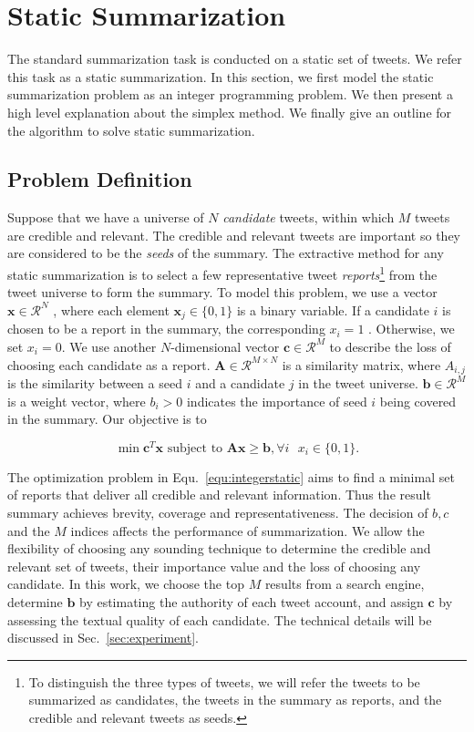 \documentclass[envcountsame]{llncs}
\begin{document}
\section{Static Summarization}\label{sec:static}
%
The standard summarization task is conducted on a static set of tweets. We refer this task as a static summarization. In this section, we first model the static summarization problem as an integer programming problem. We then present a high level explanation about the simplex method. We finally give an outline for the algorithm to solve static summarization.
\subsection{Problem Definition}
Suppose that we have a universe of $N$ \emph{candidate} tweets, within which $M$ tweets are credible and relevant. The credible and relevant tweets are important so they are considered to be the \emph{seeds} of the summary. The extractive method for any static summarization is to select a few representative tweet \emph{reports}\footnote{To distinguish the three types of tweets, we will refer the tweets to be summarized as candidates, the tweets in the summary as reports, and the credible and relevant tweets as seeds.} from the tweet universe to form the summary. To model this problem, we use a vector $\mathbf{x}\in \mathcal{R}^N$ , where each element $\mathbf{x}_j\in \{0,1\}$ is a binary variable. If a candidate  $i$ is chosen to be a report in the summary, the corresponding $x_i=1$ . Otherwise, we set  $x_i=0$. We use another $N$-dimensional vector $\mathbf{c}\in \mathcal{R}^M$ to describe the loss of choosing each candidate as a report. $\mathbf{A}\in\mathcal{R}^{M\times N}$  is a similarity matrix, where $A_{i,j}$  is the similarity between a seed $i$ and a candidate $j$ in the tweet universe. $\mathbf{b}\in \mathcal{R}^{M}$ is a weight vector, where $b_{i}>0$ indicates the importance of seed $i$ being covered in the summary. Our objective is to

\begin{equation}\label{equ:integerstatic}
\min \mathbf{c}^T \mathbf{x} \textrm{ subject to } \mathbf{A} \mathbf{x} \geq \mathbf{b}, \forall i\textrm{ } x_i\in \{0,1\}.
\end{equation}

The optimization problem in Equ.~\ref{equ:integerstatic} aims to find a minimal set of reports that deliver all credible and relevant information. Thus the result summary achieves brevity, coverage and representativeness. The decision of $b,c$ and the $M$ indices affects the performance of summarization. We allow the flexibility of choosing any sounding technique to determine the credible and relevant set of tweets, their importance value and the loss of choosing any candidate. In this work,  we  choose the top $M$ results from a search engine, determine $\mathbf{b}$  by estimating  the authority of each tweet account, and assign $\mathbf{c}$ by assessing the textual quality of each candidate. The technical details will be discussed in Sec.~\ref{sec:experiment}.
\end{document}
